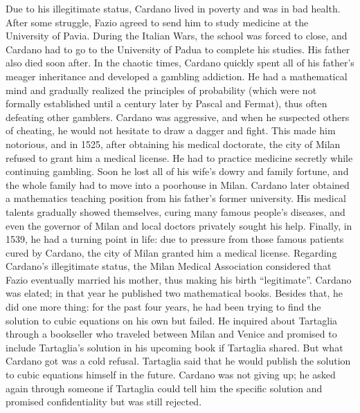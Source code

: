\documentclass[b5paper]{article}
\begin{document}
Due to his illegitimate status, Cardano lived in poverty and was in bad health. After some struggle, Fazio agreed to send him to study medicine at the University of Pavia. During the Italian Wars, the school was forced to close, and Cardano had to go to the University of Padua to complete his studies. His father also died soon after. In the chaotic times, Cardano quickly spent all of his father's meager inheritance and developed a gambling addiction. He had a mathematical mind and gradually realized the principles of probability (which were not formally established until a century later by Pascal and Fermat), thus often defeating other gamblers. Cardano was aggressive, and when he suspected others of cheating, he would not hesitate to draw a dagger and fight. This made him notorious, and in 1525, after obtaining his medical doctorate, the city of Milan refused to grant him a medical license. He had to practice medicine secretly while continuing gambling. Soon he lost all of his wife's dowry and family fortune, and the whole family had to move into a poorhouse in Milan. Cardano later obtained a mathematics teaching position from his father's former university. His medical talents gradually showed themselves, curing many famous people's diseases, and even the governor of Milan and local doctors privately sought his help. Finally, in 1539, he had a turning point in life: due to pressure from those famous patients cured by Cardano, the city of Milan granted him a medical license. Regarding Cardano's illegitimate status, the Milan Medical Association considered that Fazio eventually married his mother, thus making his birth \enquote{legitimate}. Cardano was elated; in that year he published two mathematical books. Besides that, he did one more thing: for the past four years, he had been trying to find the solution to cubic equations on his own but failed. He inquired about Tartaglia through a bookseller who traveled between Milan and Venice and promised to include Tartaglia's solution in his upcoming book if Tartaglia shared. But what Cardano got was a cold refusal. Tartaglia said that he would publish the solution to cubic equations himself in the future. Cardano was not giving up; he asked again through someone if Tartaglia could tell him the specific solution and promised confidentiality but was still rejected.
\end{document}
